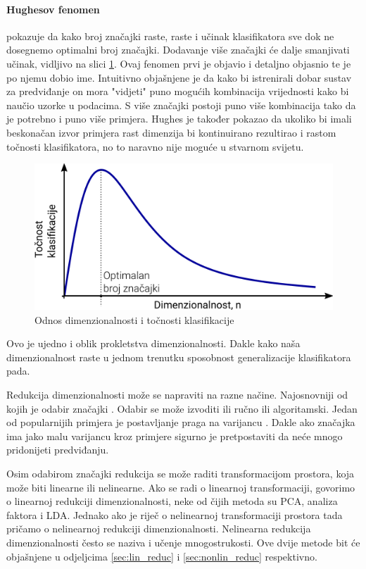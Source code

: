 \documentclass[times, utf8, diplomski]{fer}
\begin{document}
\paragraph{Hughesov fenomen}
pokazuje da kako broj značajki raste, raste i učinak klasifikatora sve dok ne dosegnemo optimalni broj značajki. Dodavanje više značajki će dalje smanjivati učinak, vidljivo na slici \ref{fig:hughes}. Ovaj fenomen prvi je objavio i detaljno objasnio \cite{hughes1968mean}te je po njemu dobio ime. Intuitivno objašnjene je da kako bi istrenirali dobar sustav za predviđanje on mora "vidjeti" puno mogućih kombinacija vrijednosti kako bi naučio uzorke u podacima. S više značajki postoji puno više kombinacija tako da je potrebno i puno više primjera. Hughes je također pokazao da ukoliko bi imali beskonačan izvor primjera rast dimenzija bi kontinuirano rezultirao i rastom točnosti klasifikatora, no to naravno nije moguće u stvarnom svijetu.
\begin{figure}[htb]
    \centering
    \includegraphics[width=12cm]{resources/images/reduction/hughes.png}
    \caption{Odnos dimenzionalnosti i točnosti klasifikacije}
    \label{fig:hughes}
\end{figure}

Ovo je ujedno i oblik prokletstva dimenzionalnosti. Dakle kako naša dimenzionalnost raste u jednom trenutku sposobnost generalizacije klasifikatora pada.

\bigskip
Redukcija dimenzionalnosti može se napraviti na razne načine. Najosnovniji od kojih je odabir značajki . Odabir se može izvoditi ili ručno ili algoritamski. Jedan od popularnijih primjera je postavljanje praga na varijancu . Dakle ako značajka ima jako malu varijancu kroz primjere sigurno je pretpostaviti da neće mnogo pridonijeti predviđanju.

\medskip
Osim odabirom značajki redukcija se može raditi transformacijom prostora, koja može biti linearne ili nelinearne. Ako se radi o linearnoj transformaciji, govorimo o linearnoj redukciji dimenzionalnosti, neke od čijih metoda su PCA, analiza faktora  i LDA. Jednako ako je riječ o nelinearnoj transformaciji prostora tada pričamo o nelinearnoj redukciji dimenzionalnosti. Nelinearna redukcija dimenzionalnosti često se naziva i učenje mnogostrukosti. Ove dvije metode bit će objašnjene u odjeljcima \ref{sec:lin_reduc} i \ref{sec:nonlin_reduc} respektivno.
\end{document}

